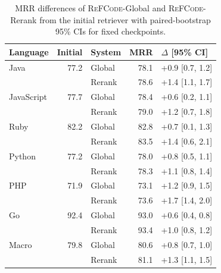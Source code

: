 \documentclass[11pt]{article}
\newcommand{\method}{\textsc{ReFCode}}
\begin{document}
\begin{table}[!t]
    \centering
    \captionsetup{skip=2pt}
    \scriptsize
    \setlength{\tabcolsep}{1.0pt}
    \renewcommand{\arraystretch}{0.88}
    \begin{tabular*}{\columnwidth}{@{\extracolsep{\fill}}lrlrl@{}}
      \toprule
      Language & Initial & System & MRR & \(\Delta\) [95\% CI] \\
      \midrule
      Java & 77.2 & Global & 78.1 & +0.9 [0.7, 1.2] \\
           &      & Rerank & 78.6 & +1.4 [1.1, 1.7] \\
      JavaScript & 77.7 & Global & 78.4 & +0.6 [0.2, 1.1] \\
           &      & Rerank & 79.0 & +1.2 [0.7, 1.8] \\
      Ruby & 82.2 & Global & 82.8 & +0.7 [0.1, 1.3] \\
           &      & Rerank & 83.5 & +1.4 [0.6, 2.1] \\
      Python & 77.2 & Global & 78.0 & +0.8 [0.5, 1.1] \\
           &      & Rerank & 78.3 & +1.1 [0.8, 1.4] \\
      PHP & 71.9 & Global & 73.1 & +1.2 [0.9, 1.5] \\
           &      & Rerank & 73.6 & +1.7 [1.4, 2.0] \\
      Go & 92.4 & Global & 93.0 & +0.6 [0.4, 0.8] \\
           &      & Rerank & 93.4 & +1.0 [0.8, 1.2] \\
      \midrule
      Macro & 79.8 & Global & 80.6 & +0.8 [0.7, 1.0] \\
            &      & Rerank & 81.1 & +1.3 [1.1, 1.5] \\
      \bottomrule
    \end{tabular*}
    \caption{MRR differences of \method{}-Global and \method{}-Rerank from the initial retriever with paired-bootstrap 95\% CIs for fixed checkpoints.}
    \label{tab:bootstrap}
\end{table}
\end{document}
